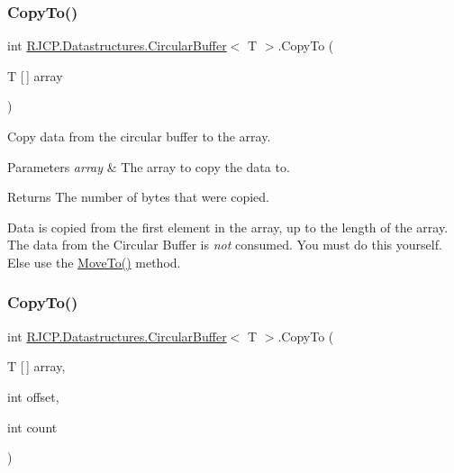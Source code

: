 \subsubsection{\texorpdfstring{CopyTo()}{CopyTo()}\hspace{0.1cm}{\footnotesize\ttfamily [1/2]}}
{\footnotesize\ttfamily int \mbox{\hyperlink{class_r_j_c_p_1_1_datastructures_1_1_circular_buffer}{R\+J\+C\+P.\+Datastructures.\+Circular\+Buffer}}$<$ T $>$.Copy\+To (\begin{DoxyParamCaption}\item[{T \mbox{[}$\,$\mbox{]}}]{array }\end{DoxyParamCaption})}



Copy data from the circular buffer to the array. 


\begin{DoxyParams}{Parameters}
{\em array} & The array to copy the data to.\\
\hline
\end{DoxyParams}
\begin{DoxyReturn}{Returns}
The number of bytes that were copied.
\end{DoxyReturn}


Data is copied from the first element in the array, up to the length of the array. The data from the Circular Buffer is {\itshape not} consumed. You must do this yourself. Else use the \mbox{\hyperlink{class_r_j_c_p_1_1_datastructures_1_1_circular_buffer_ad7524ae69bbcbca58bfba02c65ea9cf8}{Move\+To()}} method. \mbox{\label{class_r_j_c_p_1_1_datastructures_1_1_circular_buffer_acad3a14b8d66b7aa307565fab22cb851}} 
\subsubsection{\texorpdfstring{CopyTo()}{CopyTo()}\hspace{0.1cm}{\footnotesize\ttfamily [2/2]}}
{\footnotesize\ttfamily int \mbox{\hyperlink{class_r_j_c_p_1_1_datastructures_1_1_circular_buffer}{R\+J\+C\+P.\+Datastructures.\+Circular\+Buffer}}$<$ T $>$.Copy\+To (\begin{DoxyParamCaption}\item[{T \mbox{[}$\,$\mbox{]}}]{array,  }\item[{int}]{offset,  }\item[{int}]{count }\end{DoxyParamCaption})}




